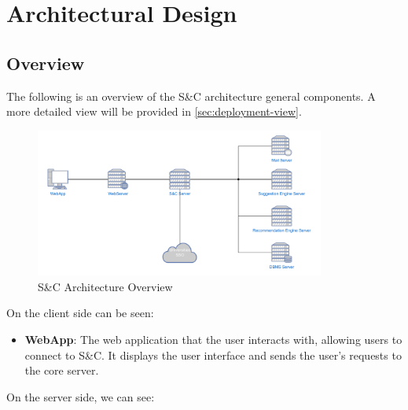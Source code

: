 \chapter{Architectural Design}
\label{ch:architectural-design}%

\section{Overview}
\label{sec:overview}%

\par The following is an overview of the S\&C architecture general components. A more detailed view will be provided in
\ref{sec:deployment-view}.

\begin{figure}[H]
      \centering
      \includegraphics[width=0.85\textwidth]{Images/Overview_diagram.pdf}
      \caption{S\&C Architecture Overview}
      \label{fig:overview}
\end{figure}

\par On the client side can be seen:

\begin{itemize}
      \item \textbf{WebApp}: The web application that the user interacts with, allowing users to connect to S\&C.
            It displays the user interface and sends the user's requests to the core server.
\end{itemize}

\par On the server side, we can see:

